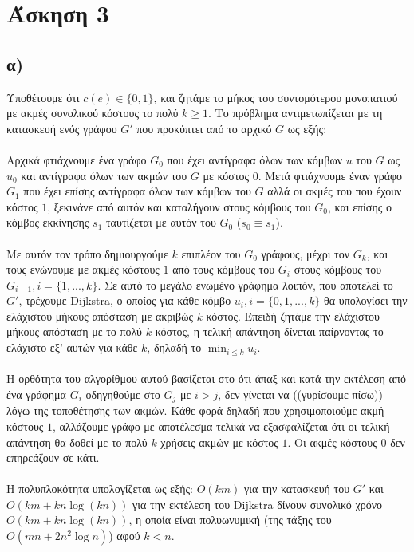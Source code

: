 \documentclass[12pt,a4paper]{article}
\begin{document}
  \section{Άσκηση 3}

  \subsection{α)}

    Υποθέτουμε ότι \(c(e)\in \{0, 1\}\), και ζητάμε το μήκος του συντομότερου
    μονοπατιού με ακμές συνολικού κόστους το πολύ \(k\ge 1\). Το πρόβλημα
    αντιμετωπίζεται με τη κατασκευή ενός γράφου \(G'\) που προκύπτει από το
    αρχικό \(G\) ως εξής:
    \\
    \\
    Αρχικά φτιάχνουμε ένα γράφο \(G_0\) που έχει αντίγραφα
    όλων
    των κόμβων \(u\) του \(G\) ως \(u_0\) και αντίγραφα όλων των ακμών του \(G\)
    με κόστος \(0\). Μετά
    φτιάχνουμε έναν γράφο \(G_1\) που έχει επίσης αντίγραφα όλων των κόμβων του
    \(G\) αλλά οι ακμές του που έχουν κόστος \(1\), ξεκινάνε από αυτόν και
    καταλήγουν στους κόμβους
    του \(G_0\), και επίσης ο κόμβος εκκίνησης \(s_1\) ταυτίζεται με αυτόν του
    \(G_0\) (\(s_0 \equiv s_1\)).
    \\
    \\
    Με αυτόν τον τρόπο δημιουργούμε \(k\) επιπλέον του \(G_0\) γράφους, μέχρι
    τον \(G_k\), και τους ενώνουμε με ακμές κόστους \(1\) από τους κόμβους του
    \(G_i\) στους κόμβους του \(G_{i-1}, i = \{1, ..., k\}\). Σε αυτό το μεγάλο
    ενωμένο γράφημα λοιπόν, που αποτελεί το \(G'\), τρέχουμε {\latintext
    Dijkstra}, ο οποίος για κάθε κόμβο \(u_i, i=\{0, 1, ..., k\}\) θα υπολογίσει
    την ελάχιστου μήκους απόσταση με ακριβώς \(k\) κόστος. Επειδή ζητάμε
    την ελάχιστου μήκους απόσταση με το πολύ \(k\) κόστος, η τελική απάντηση
    δίνεται παίρνοντας το ελάχιστο εξ' αυτών για κάθε \(k\), δηλαδή το
    \(\min_{i \le k}u_i\).
    \\
    \\
    Η ορθότητα του αλγορίθμου αυτού βασίζεται στο ότι άπαξ και κατά την
    εκτέλεση από ένα γράφημα \(G_i\) οδηγηθούμε στο \(G_j\) με \(i > j\), δεν
    γίνεται να ((γυρίσουμε πίσω)) λόγω της τοποθέτησης των ακμών. Κάθε φορά
    δηλαδή που χρησιμοποιούμε ακμή κόστους \(1\), αλλάζουμε γράφο με αποτέλεσμα
    τελικά να εξασφαλίζεται ότι οι τελική απάντηση θα δοθεί με το πολύ \(k\)
    χρήσεις ακμών με κόστος \(1\). Οι ακμές κόστους \(0\) δεν επηρεάζουν σε
    κάτι.
    \\
    \\
    Η πολυπλοκότητα υπολογίζεται ως εξής: \(Ο(km)\) για την κατασκευή του \(G'\)
    και \(Ο(km + kn\log{(kn)})\) για την εκτέλεση του {\latintext Dijkstra}
    δίνουν συνολικό χρόνο \(Ο(km + kn\log{(kn)})\), η οποία είναι πολυωνυμική
    (της τάξης του \(O(mn + 2n^2\log{n})\)) αφού \(k < n\).
\end{document}
